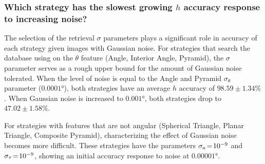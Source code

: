 \subsubsection{Which strategy has the slowest growing $h$ accuracy response to increasing noise?}
The selection of the retrieval $\sigma$ parameters plays a significant role in accuracy of each strategy given images
with Gaussian noise.
For strategies that search the database using on the $\theta$ feature (Angle, Interior Angle, Pyramid), the $\sigma$
parameter serves as a rough upper bound for the amount of Gaussian noise tolerated.
When the level of noise is equal to the Angle and Pyramid $\sigma_\theta$ parameter ($\ang{0.0001}$),
both strategies have an average $h$ accuracy of $98.59\!\pm\!1.34\%$.
When Gaussian noise is increased to $\ang{0.001}$, both strategies drop to $47.02\!\pm\!1.58\%$.

For strategies with features that are not angular (Spherical Triangle, Planar Triangle, Composite Pyramid),
characterizing the effect of Gaussian noise becomes more difficult.
These strategies have the parameters $\sigma_a \!=\! 10^{-9}$ and $\sigma_\tau \!=\! 10^{-9}$, showing an initial
accuracy response to noise at $\ang{0.00001}$.

